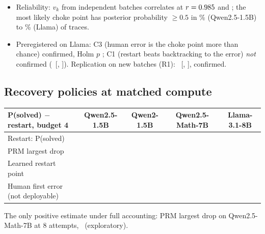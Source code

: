 \documentclass[11pt,a4paper]{article}
\begin{document}
\begin{itemize}
\item Reliability: $v_k$ from independent batches correlates at $r=0.985$ and
\QwenTwoAllSplitR; the most likely choke point has posterior probability $\ge 0.5$ in
\QwenSmallAllPostModal\% (Qwen2.5-1.5B) to \LlamaPostModal\% (Llama) of traces.
\item Preregistered on Llama: C3 (human error is the choke point more than chance) confirmed, Holm
$p$ \LlamaHolmCThree; C1 (restart beats backtracking to the error) \emph{not} confirmed
(\LlamaBtRestErr\ [\LlamaBtRestErrLo, \LlamaBtRestErrHi]). Replication on new batches (R1): \PooledNewBtRestErr\
[\PooledNewBtRestErrLo, \PooledNewBtRestErrHi], confirmed.
\end{itemize}

\subsection{Recovery policies at matched compute}
\begin{tabularx}{\linewidth}{Xcccc}
\toprule
P(solved) $-$ restart, budget 4 & Qwen2.5-1.5B & Qwen2-1.5B & Qwen2.5-Math-7B & Llama-3.1-8B\\\midrule
Restart: P(solved) & \QwenSmallPolRestartFour & \QwenTwoPolRestartFour & \QwenMathPolRestartFour & \LlamaPolRestartFour\\
PRM largest drop & \QwenSmallPolPrmDropFourDiff & \QwenTwoPolPrmDropFourDiff & \QwenMathPolPrmDropFourDiff & \LlamaPolPrmDropFourDiff\\
Learned restart point & \QwenSmallPolLearnedFourDiff & \QwenTwoPolLearnedFourDiff & \QwenMathPolLearnedFourDiff & \LlamaPolLearnedFourDiff\\
Human first error (not deployable) & \QwenSmallPolHumanFourDiff & \QwenTwoPolHumanFourDiff & \QwenMathPolHumanFourDiff & \LlamaPolHumanFourDiff\\\bottomrule
\end{tabularx}

The only positive estimate under full accounting: PRM largest drop on Qwen2.5-Math-7B at 8 attempts,
\QwenMathPolPrmDropEightDiff\ (exploratory).
\end{document}

